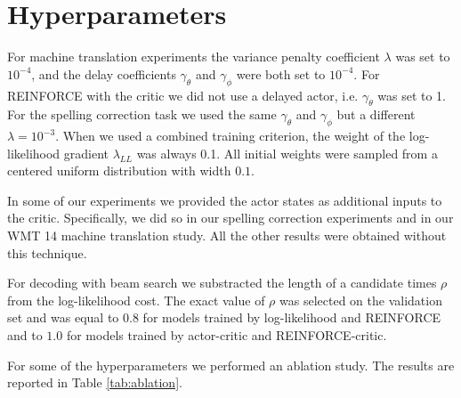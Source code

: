 \documentclass{article} \usepackage{iclr2017_conference,times}
\begin{document}



\newpage
\appendix
\section{Hyperparameters}
\label{sec:hyperparameters}

For machine translation experiments the variance penalty coefficient $\lambda$
was set to $10^{-4}$, and the delay coefficients $\gamma_{\theta}$ and
$\gamma_{\phi}$ were both set to $10^{-4}$. For REINFORCE with the critic we did not use 
a delayed actor, i.e. $\gamma_{\theta}$ was set to 1. For the spelling correction
task we used the same $\gamma_{\theta}$ and $\gamma_{\phi}$ but a different 
$\lambda=10^{-3}$. When we used a combined training criterion, the weight of the log-likelihood gradient $\lambda_{LL}$ was always 0.1. All initial weights were sampled from a centered uniform distribution with
width $0.1$.

In some of our experiments we provided the actor states as additional inputs to
the critic.  Specifically, we did so in our spelling correction experiments and
in our WMT 14 machine translation study. All the other results were obtained
without this technique.

For decoding with beam search we substracted the length of a candidate
times $\rho$ from the log-likelihood cost. The exact value of $\rho$ 
was selected on the validation set and was equal to $0.8$
for models trained by log-likelihood and REINFORCE and to $1.0$
for models trained by actor-critic and REINFORCE-critic.

For some of the hyperparameters we performed an ablation study. The results are reported in Table \ref{tab:ablation}.
\end{document}
